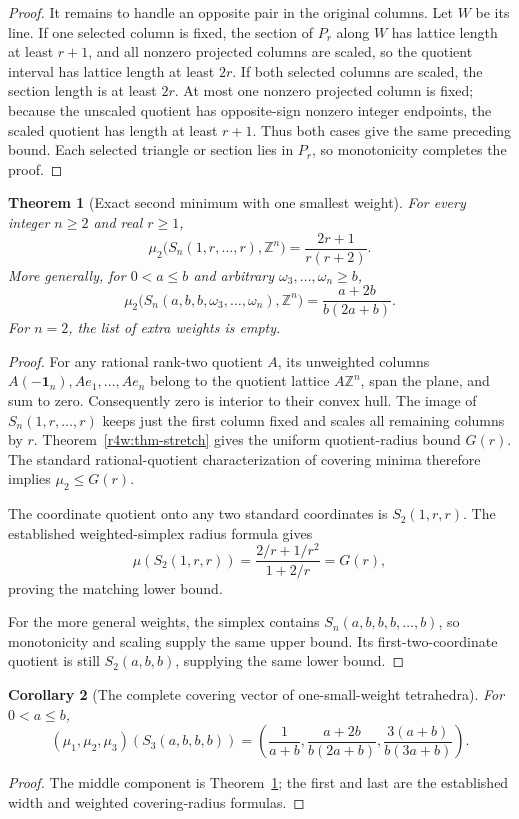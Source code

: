 \documentclass[11pt,a4paper]{article}
\newtheorem{theorem}{Theorem}[section]
\newtheorem{corollary}[theorem]{Corollary}
\theoremstyle{remark}\newtheorem{remark}[theorem]{Remark}
\begin{document}
\begin{proof}
It remains to handle an opposite pair in the original columns.
Let $W$ be its line. If one selected column is fixed, the section
of $P_r$ along $W$ has lattice length at least $r+1$, and all
nonzero projected columns are scaled, so the quotient interval
has lattice length at least $2r$. If both selected columns are
scaled, the section length is at least $2r$. At most one nonzero
projected column is fixed; because the unscaled quotient has
opposite-sign nonzero integer endpoints, the scaled quotient has
length at least $r+1$. Thus both cases give the same preceding
bound. Each selected triangle or section lies in $P_r$, so
monotonicity completes the proof.
\end{proof}

\begin{theorem}[Exact second minimum with one smallest weight]
\label{r4w:thm-mu2}
For every integer $n\ge2$ and real $r\ge1$,
\[
 \boxed{\displaystyle
 \mu_2\bigl(S_n(1,r,\ldots,r),\mathbb Z^n\bigr)
 =\frac{2r+1}{r(r+2)}.}
\]
More generally, for $0<a\le b$ and arbitrary
$\omega_3,\ldots,\omega_n\ge b$,
\[
 \boxed{\displaystyle
 \mu_2\bigl(S_n(a,b,b,\omega_3,\ldots,\omega_n),\mathbb Z^n\bigr)
 =\frac{a+2b}{b(2a+b)}.}
\]
For $n=2$, the list of extra weights is empty.
\end{theorem}
\begin{proof}
For any rational rank-two quotient $A$, its unweighted columns
$A(-\mathbf1_n),Ae_1,\ldots,Ae_n$ belong to the quotient lattice
$A\mathbb Z^n$, span the plane, and sum to zero. Consequently
zero is interior to their convex hull. The image of
$S_n(1,r,\ldots,r)$ keeps just the first column fixed and scales
all remaining columns by $r$. Theorem~\ref{r4w:thm-stretch} gives
the uniform quotient-radius bound $G(r)$.
The standard rational-quotient characterization of covering minima
therefore implies $\mu_2\le G(r)$.

The coordinate quotient onto any two standard coordinates is
$S_2(1,r,r)$. The established weighted-simplex radius formula gives
\[
 \mu(S_2(1,r,r))
 =\frac{2/r+1/r^2}{1+2/r}=G(r),
\]
proving the matching lower bound.

For the more general weights, the simplex contains
$S_n(a,b,b,b,\ldots,b)$, so monotonicity and scaling supply the
same upper bound. Its first-two-coordinate quotient is still
$S_2(a,b,b)$, supplying the same lower bound.
\end{proof}

\begin{corollary}[The complete covering vector of one-small-weight tetrahedra]
\label{r4w:cor-vector}
For $0<a\le b$,
\[
 (\mu_1,\mu_2,\mu_3)(S_3(a,b,b,b))
 =\left(\frac1{a+b},\frac{a+2b}{b(2a+b)},
              \frac{3(a+b)}{b(3a+b)}\right).
\]
\end{corollary}
\begin{proof}
The middle component is Theorem~\ref{r4w:thm-mu2}; the first and
last are the established width and weighted covering-radius formulas.
\end{proof}
\end{document}
